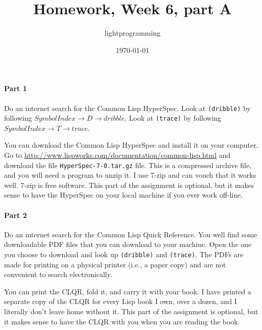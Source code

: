 \documentclass{article}
\title{Homework, Week 6, part A}
\author{lightprogramming}
\date{\today}
\begin{document}
\maketitle{}

\paragraph{Part 1}Do an internet search for the Common Lisp HyperSpec. Look at \texttt{(dribble)} by following $Symbol Index \rightarrow{} D \rightarrow{} dribble$.  Look at \texttt{(trace)} by following $Symbol Index \rightarrow{} T \rightarrow{} trace$. 

You can download the Common Lisp HyperSpec and install it on your computer. Go to \url{http://www.lispworks.com/documentation/common-lisp.html} and download the file \texttt{HyperSpec-7-0.tar.gz} file. This is a compressed archive file, and you will need a program to unzip it. I use 7-zip and can vouch that it works well. 7-zip is free software. This part of the assignment is optional, but it makes sense to have the HyperSpec on your local machine if you ever work off-line.

\paragraph{Part 2}Do an internet search for the Common Lisp Quick Reference. You well find some downloadable PDF files that you can download to your machine. Open the one you choose to download and look up \texttt{(dribble)} and  \texttt{(trace)}. The PDFs are made for printing on a physical printer (i.e., a paper copy) and are not convenient to search electronically.

You can print the CLQR, fold it, and carry it with your book. I have printed a separate copy of the CLQR for every Lisp book I own, over a dozen, and I literally don't leave home without it. This part of the assignment is optional, but it makes sense to have the CLQR with you when you are reading the book.
\end{document}
